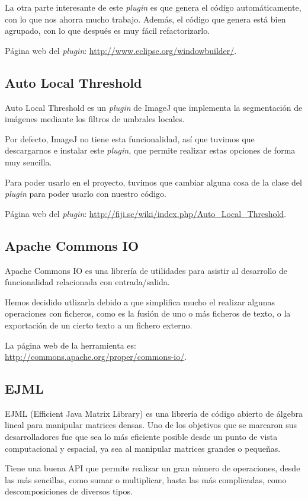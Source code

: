 La otra parte interesante de este \textit{plugin} es que genera el código automáticamente, con lo que nos ahorra mucho trabajo. Además, el código que genera está bien agrupado, con lo que después es muy fácil refactorizarlo.

Página web del \textit{plugin}: \url{http://www.eclipse.org/windowbuilder/}.

\subsection{Auto Local Threshold}
Auto Local Threshold es un \textit{plugin} de ImageJ que implementa la segmentación de imágenes mediante los filtros de umbrales locales.

Por defecto, ImageJ no tiene esta funcionalidad, así que tuvimos que descargarnos e instalar este \textit{plugin}, que permite realizar estas opciones de forma muy sencilla.

Para poder usarlo en el proyecto, tuvimos que cambiar alguna cosa de la clase del \textit{plugin} para poder usarlo con nuestro código.

Página web del \textit{plugin}: \url{http://fiji.sc/wiki/index.php/Auto_Local_Threshold}.

\subsection{Apache Commons IO}
Apache Commons IO es una librería de utilidades para asistir al desarrollo de funcionalidad relacionada con entrada/salida.

Hemos decidido utlizarla debido a que simplifica mucho el realizar algunas operaciones con ficheros, como es la fusión de uno o más ficheros de texto, o la exportación de un cierto texto a un fichero externo.

La página web de la herramienta es: \url{http://commons.apache.org/proper/commons-io/}.

\subsection{EJML}
EJML (Efficient Java Matrix Library) es una librería de código abierto de álgebra lineal para manipular matrices densas. Uno de los objetivos que se marcaron sus desarrolladores fue que sea lo más eficiente posible desde un punto de vista computacional y espacial, ya sea al manipular matrices grandes o pequeñas.

Tiene una buena API que permite realizar un gran número de operaciones, desde las más sencillas, como sumar o multiplicar, hasta las más complicadas, como descomposiciones de diversos tipos.

